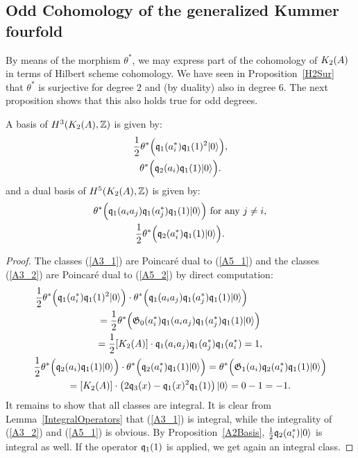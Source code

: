 \subsection{Odd Cohomology of the generalized Kummer fourfold}\label{oddcohoK2}

By means of the morphism $\theta^*$, we may express part of the cohomology of $\kum{A}{2}$ in terms of Hilbert scheme cohomology. We have seen in Proposition~\ref{H2Sur} that $\theta^*$ is surjective for degree $2$ and (by duality) also in degree $6$. 
The next proposition shows that this also holds true for odd degrees.
\begin{proposition}\label{oddcohomology}
A basis of $H^3(\X,\Z)$ is given by:
\begin{gather}
\label{A3_1}
\frac{1}{2}\theta^*\Big( \q_1(a^*_i)\q_1(1)^2\vac \Big), \\
\label{A3_2}
\theta^*\Big(\q_2(a_i)\q_1(1)\vac\Big).
\end{gather}
and a dual basis of $H^5(\X,\Z)$ is given by:
\begin{gather}
\label{A5_1}
 \theta^*\Big( \q_1(a_ia_j)\q_1(a_j^*)\q_1(1) \vac \Big) \ \text{for any } j\neq i, \\
\label{A5_2}
\frac{1}{2}\theta^*\Big( \q_2(a^*_i)\q_1(1)\vac \Big).
\end{gather}
\end{proposition}
\begin{proof}
The classes (\ref{A3_1}) are Poincar\'e dual to (\ref{A5_1}) and the classes (\ref{A3_2}) are Poincar\'e dual to (\ref{A5_2}) by direct computation:
\begin{gather*}
\frac{1}{2}\theta^*\Big( \q_1(a^*_i)\q_1(1)^2\vac \Big)\cdot \theta^*\Big( \q_1(a_ia_j)\q_1(a_j^*)\q_1(1) \vac \Big) \hspace{80pt}
\\ = \frac{1}{2} \theta^*\Big(  \G_0(a^*_i) \q_1(a_ia_j)\q_1(a_j^*)\q_1(1) \vac \Big)\\
 =  \frac{1}{2}[\X]\cdot \q_1(a_ia_j)\q_1(a_j^*)\q_1(a_i^*) = 1, \\
 \frac{1}{2}\theta^*\Big(\q_2(a_i)\q_1(1)\vac\Big)\cdot \theta^*\Big( \q_2(a^*_i)\q_1(1)\vac \Big) =\theta^*\Big( \G_1(a_i)\q_2(a^*_i)\q_1(1)\vac  \Big) \\
 = [\X]\cdot \left( 2\q_3(x) - \q_1(x)^2\q_1(1) \right) \vac = 0-1=-1.
\end{gather*}
It remains to show that all classes are integral.
It is clear from Lemma~\ref{IntegralOperators} that (\ref{A3_1}) is integral, while the integrality of (\ref{A3_2}) and (\ref{A5_1}) is obvious. By Proposition~\ref{A2Basis}, $\frac{1}{2}\q_2(a^*_i)\vac$ is integral as well. If the operator $ \q_1(1)$ is applied, we get again an integral class.
\end{proof}
